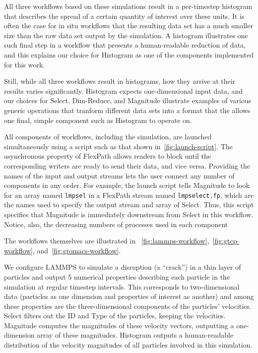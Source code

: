 
All three \sys workflows based on these simulations result in a
per-timestep histogram that describes
the spread of a certain quantity of interest over these
units.  It is often the case for in situ workflows
that the resulting data set has a much smaller size than
the raw data set output by the simulation. A histogram
illustrates one such final step in a workflow
that presents a human-readable
reduction of data, and this explains our choice for
Histogram as one of the \sys components implemented for this work.

Still, while all three workflows result in histograms,
how they arrive at their results varies significantly.
Histogram expects one-dimensional input data, and
our choices for Select, Dim-Reduce, and Magnitude
illustrate examples of various generic operations that tranform
different data sets into a format that the allows
one final, simple component such as Histogram to operate on.

All components of \sys workflows, including the simulation,
are launched simultaneously using a script such as
that shown in~\autoref{fig:launch-script}.
The asynchronous property of FlexPath
allows readers to block until the corresponding
writers are ready to send their data, and vice versa.
Providing the names of the input and output streams
lets the user connect any number of components
in any order.
For example, the launch script tells Magnitude
to look for an array named \texttt{lmpsel}
in a FlexPath stream named \texttt{lmpselect.fp},
which are the names used to specify the output
stream and array of Select.
Thus, this script specifies that Magnitude is
immediately downstream from Select in this workflow.
Notice, also, the decreasing numbers of processes
used in each component

The workflows themselves are illustrated in
~\autoref{fig:lammps-workflow},~\autoref{fig:gtcp-workflow},
and~\autoref{fig:gromacs-workflow}.

We configure LAMMPS to simulate a disruption (a ``crack'') in a thin layer of
particles and output 5 numerical properties describing each particle in the
simulation at regular timestep intervals. This corresponds to two-dimensional
data (particles as one dimension and properties of interest as another) and
among these properties are the three-dimensional components of the particles'
velocities.
Select filters out the ID and Type of the particles, keeping
the velocities. Magnitude computes the magnitudes
of these velocity vectors, outputting a one-dimension array
of these magnitudes. Histogram outputs a human-readable distribution
of the velocity magnitudes of all particles involved in this simulation.

